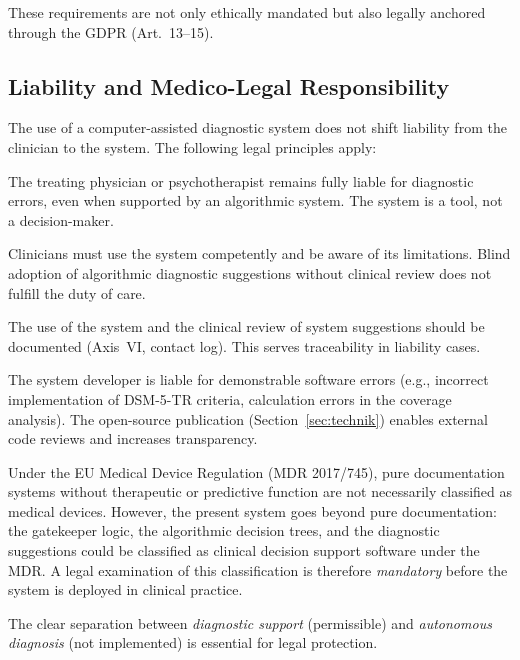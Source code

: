 \documentclass[11pt,a4paper]{article}
\begin{document}
These requirements are not only ethically mandated but also legally anchored through the GDPR (Art.~13--15).

\subsection{Liability and Medico-Legal Responsibility}

The use of a computer-assisted diagnostic system does not shift liability from the clinician to the system. The following legal principles apply:

\begin{description}[style=nextline, leftmargin=1.5cm, font=\bfseries]
\item[Clinician liability remains] The treating physician or psychotherapist remains fully liable for diagnostic errors, even when supported by an algorithmic system. The system is a tool, not a decision-maker.
\item[Duty of care in system use] Clinicians must use the system competently and be aware of its limitations. Blind adoption of algorithmic diagnostic suggestions without clinical review does not fulfill the duty of care.
\item[Documentation obligation] The use of the system and the clinical review of system suggestions should be documented (Axis~VI, contact log). This serves traceability in liability cases.
\item[Product liability of the developer] The system developer is liable for demonstrable software errors (e.g., incorrect implementation of DSM-5-TR criteria, calculation errors in the coverage analysis). The open-source publication (Section~\ref{sec:technik}) enables external code reviews and increases transparency.
\item[Medical device classification requires legal clarification] Under the EU Medical Device Regulation (MDR 2017/745), pure documentation systems without therapeutic or predictive function are not necessarily classified as medical devices. However, the present system goes beyond pure documentation: the gatekeeper logic, the algorithmic decision trees, and the diagnostic suggestions could be classified as clinical decision support software under the MDR. A legal examination of this classification is therefore \textit{mandatory} before the system is deployed in clinical practice.
\end{description}

The clear separation between \textit{diagnostic support} (permissible) and \textit{autonomous diagnosis} (not implemented) is essential for legal protection.
\end{document}
